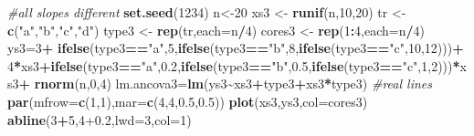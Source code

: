 \documentclass[
]{book}
\newenvironment{Shaded}{\begin{snugshade}}{\end{snugshade}}
\newcommand{\AttributeTok}[1]{\textcolor[rgb]{0.13,0.29,0.53}{#1}}
\newcommand{\CommentTok}[1]{\textcolor[rgb]{0.56,0.35,0.01}{\textit{#1}}}
\newcommand{\DecValTok}[1]{\textcolor[rgb]{0.00,0.00,0.81}{#1}}
\newcommand{\FloatTok}[1]{\textcolor[rgb]{0.00,0.00,0.81}{#1}}
\newcommand{\FunctionTok}[1]{\textcolor[rgb]{0.13,0.29,0.53}{\textbf{#1}}}
\newcommand{\NormalTok}[1]{#1}
\newcommand{\OtherTok}[1]{\textcolor[rgb]{0.56,0.35,0.01}{#1}}
\newcommand{\SpecialCharTok}[1]{\textcolor[rgb]{0.81,0.36,0.00}{\textbf{#1}}}
\newcommand{\StringTok}[1]{\textcolor[rgb]{0.31,0.60,0.02}{#1}}
\begin{document}
\begin{Shaded}
\begin{Highlighting}[]
\CommentTok{\#all slopes different}
\FunctionTok{set.seed}\NormalTok{(}\DecValTok{1234}\NormalTok{)}
\NormalTok{n}\OtherTok{\textless{}{-}}\DecValTok{20}
\NormalTok{xs3 }\OtherTok{\textless{}{-}} \FunctionTok{runif}\NormalTok{(n,}\DecValTok{10}\NormalTok{,}\DecValTok{20}\NormalTok{)}
\NormalTok{tr }\OtherTok{\textless{}{-}} \FunctionTok{c}\NormalTok{(}\StringTok{"a"}\NormalTok{,}\StringTok{"b"}\NormalTok{,}\StringTok{"c"}\NormalTok{,}\StringTok{"d"}\NormalTok{)}
\NormalTok{type3 }\OtherTok{\textless{}{-}} \FunctionTok{rep}\NormalTok{(tr,}\AttributeTok{each=}\NormalTok{n}\SpecialCharTok{/}\DecValTok{4}\NormalTok{)}
\NormalTok{cores3 }\OtherTok{\textless{}{-}} \FunctionTok{rep}\NormalTok{(}\DecValTok{1}\SpecialCharTok{:}\DecValTok{4}\NormalTok{,}\AttributeTok{each=}\NormalTok{n}\SpecialCharTok{/}\DecValTok{4}\NormalTok{)}
\NormalTok{ys3}\OtherTok{=}\DecValTok{3}\SpecialCharTok{+}
\FunctionTok{ifelse}\NormalTok{(type3}\SpecialCharTok{==}\StringTok{"a"}\NormalTok{,}\DecValTok{5}\NormalTok{,}\FunctionTok{ifelse}\NormalTok{(type3}\SpecialCharTok{==}\StringTok{"b"}\NormalTok{,}\DecValTok{8}\NormalTok{,}\FunctionTok{ifelse}\NormalTok{(type3}\SpecialCharTok{==}\StringTok{"c"}\NormalTok{,}\DecValTok{10}\NormalTok{,}\DecValTok{12}\NormalTok{)))}\SpecialCharTok{+}
\DecValTok{4}\SpecialCharTok{*}\NormalTok{xs3}\SpecialCharTok{+}\FunctionTok{ifelse}\NormalTok{(type3}\SpecialCharTok{==}\StringTok{"a"}\NormalTok{,}\FloatTok{0.2}\NormalTok{,}\FunctionTok{ifelse}\NormalTok{(type3}\SpecialCharTok{==}\StringTok{"b"}\NormalTok{,}\FloatTok{0.5}\NormalTok{,}\FunctionTok{ifelse}\NormalTok{(type3}\SpecialCharTok{==}\StringTok{"c"}\NormalTok{,}\DecValTok{1}\NormalTok{,}\DecValTok{2}\NormalTok{)))}\SpecialCharTok{*}\NormalTok{xs3}\SpecialCharTok{+}
\FunctionTok{rnorm}\NormalTok{(n,}\DecValTok{0}\NormalTok{,}\DecValTok{4}\NormalTok{)}
\NormalTok{lm.ancova3}\OtherTok{=}\FunctionTok{lm}\NormalTok{(ys3}\SpecialCharTok{\textasciitilde{}}\NormalTok{xs3}\SpecialCharTok{+}\NormalTok{type3}\SpecialCharTok{+}\NormalTok{xs3}\SpecialCharTok{*}\NormalTok{type3)}
\CommentTok{\#real lines}
\FunctionTok{par}\NormalTok{(}\AttributeTok{mfrow=}\FunctionTok{c}\NormalTok{(}\DecValTok{1}\NormalTok{,}\DecValTok{1}\NormalTok{),}\AttributeTok{mar=}\FunctionTok{c}\NormalTok{(}\DecValTok{4}\NormalTok{,}\DecValTok{4}\NormalTok{,}\FloatTok{0.5}\NormalTok{,}\FloatTok{0.5}\NormalTok{))}
\FunctionTok{plot}\NormalTok{(xs3,ys3,}\AttributeTok{col=}\NormalTok{cores3)}
\FunctionTok{abline}\NormalTok{(}\DecValTok{3}\SpecialCharTok{+}\DecValTok{5}\NormalTok{,}\DecValTok{4}\FloatTok{+0.2}\NormalTok{,}\AttributeTok{lwd=}\DecValTok{3}\NormalTok{,}\AttributeTok{col=}\DecValTok{1}\NormalTok{)}

\end{Highlighting}
\end{Shaded}
\end{document}

